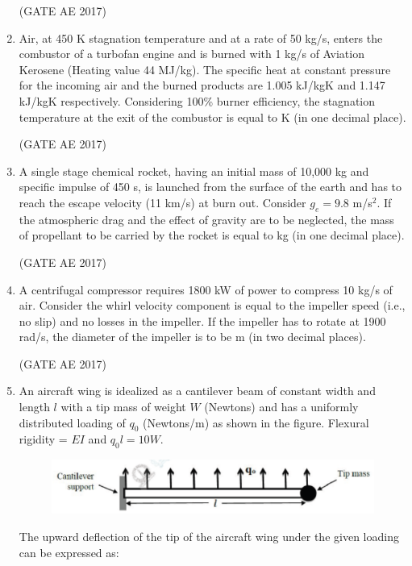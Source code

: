 \documentclass[journal,12pt,onecolumn]{IEEEtran}
\theoremstyle{remark}
\begin{document}
\begin{flushleft}
\begin{enumerate}
\hfill (GATE AE 2017)  

\item Air, at 450 K stagnation temperature and at a rate of 50 kg/s, enters the combustor of a turbofan engine and is burned with 1 kg/s of Aviation Kerosene (Heating value 44 MJ/kg). The specific heat at constant pressure for the incoming air and the burned products are 1.005 kJ/kgK and 1.147 kJ/kgK respectively. Considering 100\% burner efficiency, the stagnation temperature at the exit of the combustor is equal to \underline{\hspace{2cm}} K (in one decimal place).  

\hfill (GATE AE 2017)  
\item A single stage chemical rocket, having an initial mass of 10,000 kg and specific impulse of 450 s, is launched from the surface of the earth and has to reach the escape velocity (11 km/s) at burn out. Consider $g_e = 9.8$ m/s$^2$. If the atmospheric drag and the effect of gravity are to be neglected, the mass of propellant to be carried by the rocket is equal to \underline{\hspace{2cm}} kg (in one decimal place).  

\hfill (GATE AE 2017)  

\item A centrifugal compressor requires 1800 kW of power to compress 10 kg/s of air. Consider the whirl velocity component is equal to the impeller speed (i.e., no slip) and no losses in the impeller. If the impeller has to rotate at 1900 rad/s, the diameter of the impeller is to be \underline{\hspace{2cm}} m (in two decimal places).  

\hfill (GATE AE 2017)  

\item An aircraft wing is idealized as a cantilever beam of constant width and length $l$ with a tip mass of weight $W$ (Newtons) and has a uniformly distributed loading of $q_0$ (Newtons/m) as shown in the figure. Flexural rigidity = $EI$ and $q_0 l = 10W$.  
\begin{figure}[H]
    \centering
    \includegraphics[width=0.5\columnwidth]{figs/51.png}
    \caption{}
    \label{fig:placeholder}
\end{figure}
The upward deflection of the tip of the aircraft wing under the given loading can be expressed as:  


\end{enumerate}
\end{flushleft}
\end{document}
